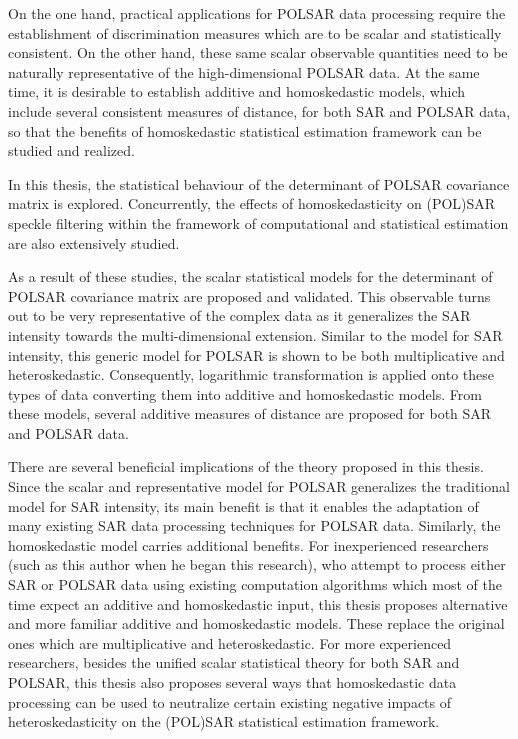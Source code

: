 

\begin{abstracts}        %

On the one hand, practical applications for POLSAR data processing require the establishment of discrimination measures
  which are to be scalar and statistically consistent.
On the other hand, these same scalar observable quantities need to be naturally representative of the high-dimensional POLSAR data.
At the same time, it is desirable to establish additive and homoskedastic models, which include several consistent measures of distance, for both SAR and POLSAR data, so that the benefits of homoskedastic statistical estimation framework can be studied and realized.

In this thesis, the statistical behaviour of the determinant of POLSAR covariance matrix is explored.
Concurrently, the effects of homoskedasticity on (POL)SAR speckle filtering within the framework of computational and statistical estimation are also extensively studied.

As a result of these studies, the scalar statistical models for the determinant of POLSAR covariance matrix are proposed and validated.
This observable turns out to be very representative of the complex data as it generalizes the SAR intensity towards the multi-dimensional extension.
Similar to the model for SAR intensity, this generic model for POLSAR is shown to be both multiplicative and heteroskedastic.
Consequently, logarithmic transformation is applied onto these types of data converting them into additive and homoskedastic models.
From these models, several additive measures of distance are proposed for both SAR and POLSAR data.

There are several beneficial implications of the theory proposed in this thesis. 
Since the scalar and representative model for POLSAR generalizes the traditional model for SAR intensity, its main benefit is that it enables the adaptation of many existing SAR data processing techniques for POLSAR data.
Similarly, the homoskedastic model carries additional benefits.
For inexperienced researchers (such as this author when he began this research),
  who attempt to process either SAR or POLSAR data using existing computation algorithms
  which most of the time expect an additive and homoskedastic input,
  this thesis proposes alternative and more familiar additive and homoskedastic models. These replace
 the original ones which are multiplicative and heteroskedastic.
For more experienced researchers, besides the unified scalar statistical theory for both SAR and POLSAR, 
  this thesis also proposes several ways that homoskedastic data processing can be used to neutralize certain existing negative impacts of heteroskedasticity on the (POL)SAR statistical estimation framework.


\end{abstracts}
